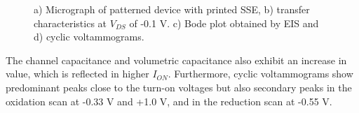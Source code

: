 \begin{figure}[ht]
    \centering
    \qquad
    \caption[Performance of solid-OECT with printed SSE]{a) Micrograph of patterned device with printed SSE, b) transfer characteristics at $V_{DS}$ of -0.1 V. c) Bode plot obtained by EIS and d) cyclic voltammograms.}
    \label{fig:printedSSE}
\end{figure}

The channel capacitance and volumetric capacitance also exhibit an increase in value, which is reflected in higher $I_{ON}$. Furthermore, cyclic voltammograms show predominant peaks close to the turn-on voltages but also secondary peaks in the oxidation scan at -0.33 V and +1.0 V, and in the reduction scan at -0.55 V. 

